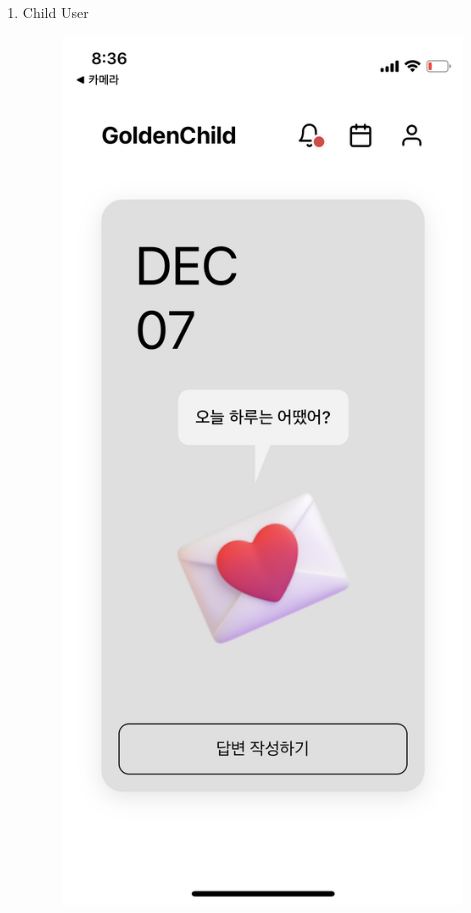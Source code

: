 \documentclass[conference]{IEEEtran}
\begin{document}
\begin{enumerate}
\begin{enumerate}
    \end{enumerate}
    \vspace{1cm}
    \item Child User
    \begin{enumerate}
        \begin{figure}[H]
        \centering
        \includegraphics[scale=0.1]{UseCases/13.cmain.png}

\end{figure}
\end{enumerate}
\end{enumerate}
\end{document}
